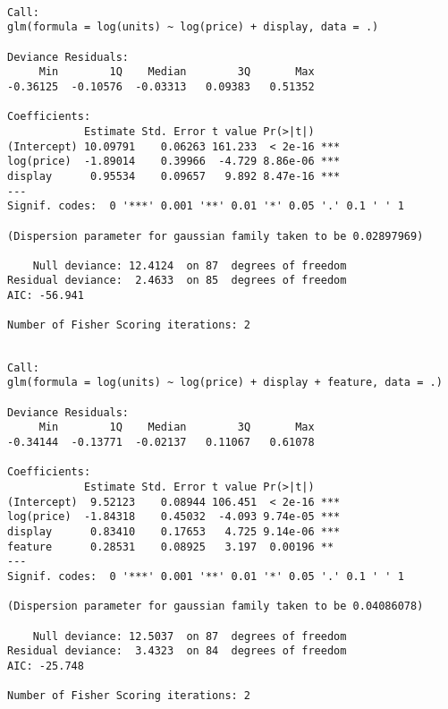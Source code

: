 \documentclass[]{article}
\newenvironment{Shaded}{\begin{snugshade}}{\end{snugshade}}
\newcommand{\DataTypeTok}[1]{\textcolor[rgb]{0.13,0.29,0.53}{#1}}
\newcommand{\KeywordTok}[1]{\textcolor[rgb]{0.13,0.29,0.53}{\textbf{#1}}}
\newcommand{\NormalTok}[1]{#1}
\newcommand{\OperatorTok}[1]{\textcolor[rgb]{0.81,0.36,0.00}{\textbf{#1}}}
\newcommand{\StringTok}[1]{\textcolor[rgb]{0.31,0.60,0.02}{#1}}
\begin{document}
\begin{verbatim}

Call:
glm(formula = log(units) ~ log(price) + display, data = .)

Deviance Residuals: 
     Min        1Q    Median        3Q       Max  
-0.36125  -0.10576  -0.03313   0.09383   0.51352  

Coefficients:
            Estimate Std. Error t value Pr(>|t|)    
(Intercept) 10.09791    0.06263 161.233  < 2e-16 ***
log(price)  -1.89014    0.39966  -4.729 8.86e-06 ***
display      0.95534    0.09657   9.892 8.47e-16 ***
---
Signif. codes:  0 '***' 0.001 '**' 0.01 '*' 0.05 '.' 0.1 ' ' 1

(Dispersion parameter for gaussian family taken to be 0.02897969)

    Null deviance: 12.4124  on 87  degrees of freedom
Residual deviance:  2.4633  on 85  degrees of freedom
AIC: -56.941

Number of Fisher Scoring iterations: 2
\end{verbatim}

\begin{Shaded}
\end{Shaded}

\begin{verbatim}

Call:
glm(formula = log(units) ~ log(price) + display + feature, data = .)

Deviance Residuals: 
     Min        1Q    Median        3Q       Max  
-0.34144  -0.13771  -0.02137   0.11067   0.61078  

Coefficients:
            Estimate Std. Error t value Pr(>|t|)    
(Intercept)  9.52123    0.08944 106.451  < 2e-16 ***
log(price)  -1.84318    0.45032  -4.093 9.74e-05 ***
display      0.83410    0.17653   4.725 9.14e-06 ***
feature      0.28531    0.08925   3.197  0.00196 ** 
---
Signif. codes:  0 '***' 0.001 '**' 0.01 '*' 0.05 '.' 0.1 ' ' 1

(Dispersion parameter for gaussian family taken to be 0.04086078)

    Null deviance: 12.5037  on 87  degrees of freedom
Residual deviance:  3.4323  on 84  degrees of freedom
AIC: -25.748

Number of Fisher Scoring iterations: 2
\end{verbatim}
\end{document}
